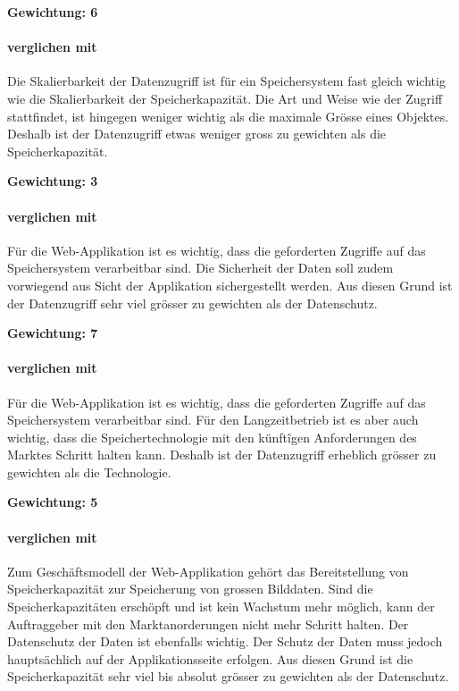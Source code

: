 \textbf{Gewichtung: 6}

\paragraph*{ verglichen mit }
Die Skalierbarkeit der Datenzugriff ist für ein Speichersystem fast gleich wichtig wie die Skalierbarkeit der Speicherkapazität. Die Art und Weise wie der Zugriff stattfindet, ist hingegen weniger wichtig als die maximale Grösse eines Objektes. Deshalb ist der Datenzugriff etwas weniger gross zu gewichten als die Speicherkapazität. 

\textbf{Gewichtung: 3}

\paragraph*{ verglichen mit }
Für die Web-Applikation ist es wichtig, dass die geforderten Zugriffe auf das Speichersystem verarbeitbar sind. Die Sicherheit der Daten soll zudem vorwiegend aus Sicht der Applikation sichergestellt werden. Aus diesen Grund ist der Datenzugriff sehr viel grösser zu gewichten als der Datenschutz.

\textbf{Gewichtung: 7}

\paragraph*{ verglichen mit }
Für die Web-Applikation ist es wichtig, dass die geforderten Zugriffe auf das Speichersystem verarbeitbar sind. Für den Langzeitbetrieb ist es aber auch wichtig, dass die Speichertechnologie mit den künftîgen Anforderungen des Marktes Schritt halten kann. Deshalb ist der Datenzugriff erheblich grösser zu gewichten als die Technologie.

\textbf{Gewichtung: 5}

\paragraph*{ verglichen mit }
Zum Geschäftsmodell der Web-Applikation gehört das Bereitstellung von Speicherkapazität zur Speicherung von grossen Bilddaten. Sind die Speicherkapazitäten erschöpft und ist kein Wachstum mehr möglich, kann der Auftraggeber mit den Marktanorderungen nicht mehr Schritt halten. Der Datenschutz der Daten ist ebenfalls wichtig. Der Schutz der Daten muss jedoch hauptsächlich auf der Applikationsseite erfolgen. Aus diesen Grund ist die Speicherkapazität sehr viel bis absolut grösser zu gewichten als der Datenschutz.

